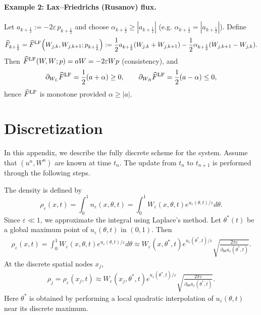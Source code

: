\documentclass[11pt, dina4, amsfont12]{article}
\begin{document}
\paragraph{Example 2: Lax--Friedrichs (Rusanov) flux.}
Let $a_{k+\frac12}:=-2\varepsilon\,p_{k+\frac12}$ and choose
$\alpha_{k+\frac12}\ge |a_{k+\frac12}|$ (e.g. $\alpha_{k+\frac12}=|a_{k+\frac12}|$).
Define
\begin{equation}\label{eq:flux_lf}
\widehat F_{k+\frac12}
=\widehat F^{\rm LF}\!\left(W_{j,k},W_{j,k+1};p_{k+\frac12}\right)
:=\frac12 a_{k+\frac12}(W_{j,k}+W_{j,k+1})
-\frac12 \alpha_{k+\frac12}(W_{j,k+1}-W_{j,k}).
\end{equation}
Then $\widehat F^{\rm LF}(W,W;p)=aW=-2\varepsilon W p$ (consistency), and
\[
\partial_{W_L}\widehat F^{\rm LF}=\frac12(a+\alpha)\ge0,\qquad
\partial_{W_R}\widehat F^{\rm LF}=\frac12(a-\alpha)\le0,
\]
hence $\widehat F^{\rm LF}$ is monotone provided $\alpha\ge|a|$.

\section{Discretization}
In this appendix, we describe the fully discrete scheme for the system. Assume that $(u^n, W^n)$ are known at time $t_n$. The update from $t_n$ to $t_{n+1}$ is performed through the following steps.

The density is defined by
$$\rho_\varepsilon(x, t) = \int_0^1 n_\varepsilon(x, \theta, t) = \int_0^1 W_\varepsilon(x,\theta,t)e^{u_\varepsilon(\theta, t)/\varepsilon} d\theta.$$
Since $\varepsilon\ll 1$, we approximate the integral using Laplace's method. Let $\theta^*(t)$ be a global maximum point of $u_\varepsilon(\theta, t)$ in $(0, 1)$. Then 
\begin{align}
\rho_\varepsilon(x, t) = \int_0^1 W_\varepsilon(x, \theta, t) e^{u_\varepsilon(\theta, t)/\varepsilon} d\theta
\approx W_\varepsilon (x, \theta^*, t) e^{u_\varepsilon(\theta^*,t)/\varepsilon} \sqrt{\frac{2\pi\varepsilon}{\partial_{\theta\theta}u_\varepsilon(\theta^*, t)}}.   
\end{align}
At the discrete spatial nodes $x_j$,
\begin{align}
\rho_j =\rho_\varepsilon(x_j, t) 
\approx W_\varepsilon (x_j, \theta^*, t) e^{u_\varepsilon(\theta^*,t)/\varepsilon} \sqrt{\frac{2\pi\varepsilon}{\partial_{\theta\theta}u_\varepsilon(\theta^*, t)}}.   
\end{align}
Here $\theta^*$ is obtained by performing a local quadratic interpolation of
$u_\varepsilon(\theta,t)$ near its discrete maximum.
\end{document}
